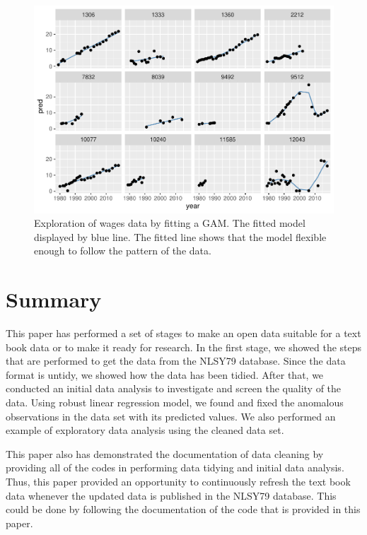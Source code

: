 \begin{Schunk}
\begin{figure}
\includegraphics{figures/gam-plot-1} \caption[Exploration of wages data by fitting a GAM]{Exploration of wages data by fitting a GAM. The fitted model displayed by blue line. The fitted line shows that the model flexible enough to follow the pattern of the data.}\label{fig:gam-plot}
\end{figure}
\end{Schunk}

\hypertarget{summary}{%
\section{Summary}\label{summary}}

This paper has performed a set of stages to make an open data suitable
for a text book data or to make it ready for research. In the first
stage, we showed the steps that are performed to get the data from the
NLSY79 database. Since the data format is untidy, we showed how the data
has been tidied. After that, we conducted an initial data analysis to
investigate and screen the quality of the data. Using robust linear
regression model, we found and fixed the anomalous observations in the
data set with its predicted values. We also performed an example of
exploratory data analysis using the cleaned data set.

This paper also has demonstrated the documentation of data cleaning by
providing all of the codes in performing data tidying and initial data
analysis. Thus, this paper provided an opportunity to continuously
refresh the text book data whenever the updated data is published in the
NLSY79 database. This could be done by following the documentation of
the code that is provided in this paper.

